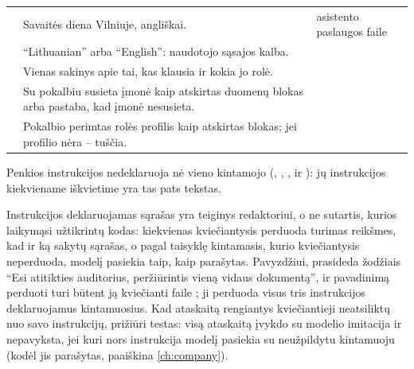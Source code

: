 \begin{xltabular}{\textwidth}{@{}L{35mm}YL{48mm}@{}}
 & Savaitės diena Vilniuje, angliškai. &  asistento paslaugos faile  \\
 & \enquote{Lithuanian} arba \enquote{English}: naudotojo sąsajos kalba. &  \\
 & Vienas sakinys apie tai, kas klausia ir kokia jo rolė. &  \\
 & Su pokalbiu susieta įmonė kaip atskirtas duomenų blokas arba pastaba, kad įmonė nesusieta. &  \\
 & Pokalbio perimtas rolės profilis kaip atskirtas blokas; jei profilio nėra -- tuščia. &  \\
\end{xltabular}

Penkios instrukcijos nedeklaruoja nė vieno kintamojo (,
, ,  ir
): jų instrukcijos kiekviename iškvietime yra tas pats tekstas.

Instrukcijos deklaruojamas sąrašas yra teiginys redaktoriui, o ne sutartis, kurios laikymąsi
užtikrintų kodas: kiekvienas kviečiantysis perduoda turimas reikšmes, kad ir ką sakytų sąrašas,
o pagal  taisyklę kintamasis, kurio kviečiantysis neperduoda, modelį pasiekia taip,
kaip parašytas. Pavyzdžiui,  prasideda žodžiais
\enquote{Esi atitikties auditorius, peržiūrintis vieną  vidaus dokumentą},
ir pavadinimą perduoti turi būtent ją kviečianti  faile
; ji perduoda visus tris instrukcijos deklaruojamus kintamuosius.
Kad ataskaitą rengiantys kviečiantieji neatsiliktų nuo savo instrukcijų, prižiūri testas:
 visą ataskaitą įvykdo su modelio imitacija ir nepavyksta,
jei kuri nors instrukcija modelį pasiekia su neužpildytu kintamuoju (kodėl jis parašytas,
paaiškina \cref{ch:company}).


